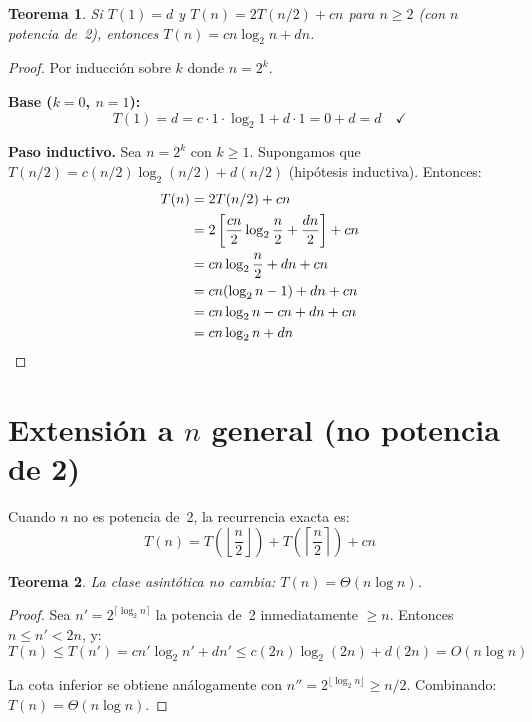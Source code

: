 \documentclass[11pt, letterpaper]{article}
\theoremstyle{definition}
\theoremstyle{plain}
\newtheorem{theorem}{Teorema}[section]
\theoremstyle{remark}
\begin{document}
\begin{theorem}\label{thm:substitution}
Si $T(1) = d$ y $T(n) = 2T(n/2) + cn$ para $n \geq 2$ (con $n$
potencia de~2), entonces $T(n) = cn\log_2 n + dn$.
\end{theorem}

\begin{proof}
Por inducción sobre $k$ donde $n = 2^k$.

\textbf{Base ($k = 0$, $n = 1$):}
\[
  T(1) = d = c \cdot 1 \cdot \log_2 1 + d \cdot 1 = 0 + d = d
  \quad \checkmark
\]

\textbf{Paso inductivo.} Sea $n = 2^k$ con $k \geq 1$. Supongamos que
$T(n/2) = c(n/2)\log_2(n/2) + d(n/2)$ (hipótesis inductiva). Entonces:
\begin{align*}
  T(n) &= 2T(n/2) + cn \\
       &= 2\left[\frac{cn}{2}\log_2\frac{n}{2}
         + \frac{dn}{2}\right] + cn \\
       &= cn\log_2\frac{n}{2} + dn + cn \\
       &= cn(\log_2 n - 1) + dn + cn \\
       &= cn\log_2 n - cn + dn + cn \\
       &= cn\log_2 n + dn \qedhere
\end{align*}
\end{proof}

\section{Extensión a $n$ general (no potencia de 2)}

Cuando $n$ no es potencia de~2, la recurrencia exacta es:
\[
  T(n) = T\!\left(\left\lfloor \frac{n}{2} \right\rfloor\right)
       + T\!\left(\left\lceil \frac{n}{2} \right\rceil\right) + cn
\]

\begin{theorem}\label{thm:general-n}
La clase asintótica no cambia: $T(n) = \Theta(n \log n)$.
\end{theorem}

\begin{proof}
Sea $n' = 2^{\lceil \log_2 n \rceil}$ la potencia de~2 inmediatamente
$\geq n$. Entonces $n \leq n' < 2n$, y:
\[
  T(n) \leq T(n') = cn'\log_2 n' + dn'
  \leq c(2n)\log_2(2n) + d(2n) = O(n\log n)
\]

La cota inferior se obtiene análogamente con
$n'' = 2^{\lfloor \log_2 n \rfloor} \geq n/2$. Combinando:
$T(n) = \Theta(n \log n)$.
\end{proof}
\end{document}
